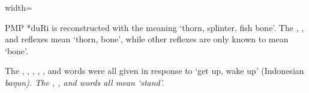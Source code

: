 \begin{table}
\begin{adjustbox}{width=\textwidth}
\begin{threeparttable}
\begin{tablenotes}
			\item[†]	{PMP *duRi is reconstructed with the meaning ‘thorn, splinter, fish bone’.
								The , , and  reflexes mean ‘thorn,
								bone’, while other reflexes are only known to mean ‘bone’.}
			\item[‡]	{The ,
								, , , ,
								and  words were all given in response to ‘get up,
								wake up’ (Indonesian \it{baŋun}).
								The , , and  words all mean ‘stand’.}
		\end{tablenotes}
	\end{threeparttable}
\end{adjustbox}
\end{table}

